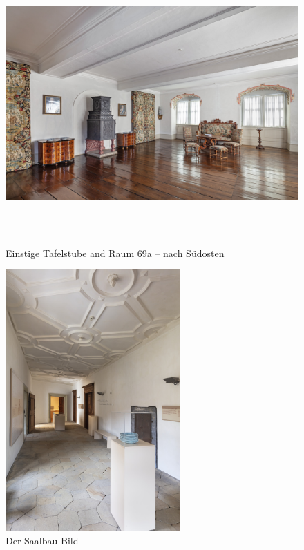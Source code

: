 \documentclass[
  a4paper,
]{book}
\begin{document}
\begin{figure}
\includegraphics[height=10cm]{images/fmd10005852a.jpg}

\caption{Einstige Tafelstube and Raum 69a – nach Südosten}
\label{fig:{images/fmd10005852a.jpg}}

\clearpage

\centering

\includegraphics[height=10cm]{images/fmd10005855a.jpg}

\caption{Der Saalbau Bild}
\label{fig:{images/fmd10005855a.jpg}}

\clearpage

\centering


\end{figure}
\end{document}
